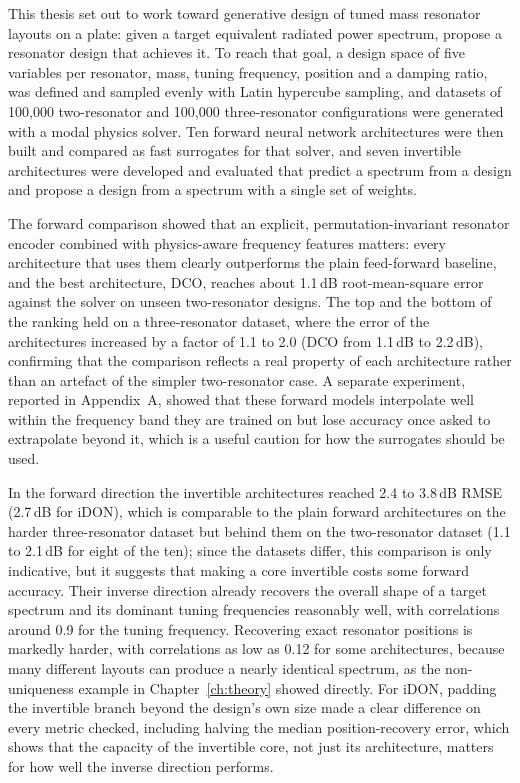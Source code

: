 This thesis set out to work toward generative design of tuned mass resonator layouts on a plate: given a target equivalent radiated power spectrum, propose a resonator design that achieves it. To reach that goal, a design space of five variables per resonator, mass, tuning frequency, position and a damping ratio, was defined and sampled evenly with Latin hypercube sampling, and datasets of 100{,}000 two-resonator and 100{,}000 three-resonator configurations were generated with a modal physics solver. Ten forward neural network architectures were then built and compared as fast surrogates for that solver, and seven invertible architectures were developed and evaluated that predict a spectrum from a design and propose a design from a spectrum with a single set of weights.

The forward comparison showed that an explicit, permutation-invariant resonator encoder combined with physics-aware frequency features matters: every architecture that uses them clearly outperforms the plain feed-forward baseline, and the best architecture, DCO, reaches about 1.1\,dB root-mean-square error against the solver on unseen two-resonator designs. The top and the bottom of the ranking held on a three-resonator dataset, where the error of the architectures increased by a factor of 1.1 to 2.0 (DCO from 1.1\,dB to 2.2\,dB), confirming that the comparison reflects a real property of each architecture rather than an artefact of the simpler two-resonator case. A separate experiment, reported in Appendix~A, showed that these forward models interpolate well within the frequency band they are trained on but lose accuracy once asked to extrapolate beyond it, which is a useful caution for how the surrogates should be used.

In the forward direction the invertible architectures reached 2.4 to 3.8\,dB RMSE (2.7\,dB for iDON), which is comparable to the plain forward architectures on the harder three-resonator dataset but behind them on the two-resonator dataset (1.1 to 2.1\,dB for eight of the ten); since the datasets differ, this comparison is only indicative, but it suggests that making a core invertible costs some forward accuracy. Their inverse direction already recovers the overall shape of a target spectrum and its dominant tuning frequencies reasonably well, with correlations around 0.9 for the tuning frequency. Recovering exact resonator positions is markedly harder, with correlations as low as 0.12 for some architectures, because many different layouts can produce a nearly identical spectrum, as the non-uniqueness example in Chapter~\ref{ch:theory} showed directly. For iDON, padding the invertible branch beyond the design's own size made a clear difference on every metric checked, including halving the median position-recovery error, which shows that the capacity of the invertible core, not just its architecture, matters for how well the inverse direction performs.

